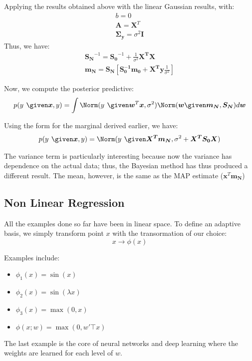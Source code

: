 \documentclass{article}
\renewcommand{\v}{\boldsymbol}
\begin{document}
Applying the results obtained above with the linear Gaussian results, with:
	\begin{align*}
		b = 0 \\
		\v{A} = \v{X}^T \\
		\v{\Sigma_y} = \sigma^2 \v{I}
	\end{align*}
	Thus, we have:
	\begin{align*}
		\v{S_N}^{-1} = \v{S_0}^{-1} + \frac{1}{\sigma^2}\v{X^T} \v{X} \\
		\v{m_N} = \v{S_N} \left [\v{S_0^{-1}} \v{m_0} + \v{X^T} \v{y} \frac{1}{\sigma^2} \right]
	\end{align*}
	
	Now, we compute the posterior predictive:
	\begin{align*}
		p(y^{~} \given \v{x}, y) = \int \Norm(y^{~}\given \v{w}^T \v{x}, \sigma^2) \Norm(\v{w} \given \v{m_N}, \v{S_N}) d\v{w}
	\end{align*}
	
	Using the form for the marginal derived earlier, we have:
	\begin{align*}
		p(y^{~} \given \v{x}, y) = \Norm (y^{~} \given \v{X^T} \v{m_N}, \sigma^2 + \v{X^T} \v{S_0} \v{X})
	\end{align*}
	
	The variance term is particularly interesting because now the variance has dependence on the actual data; thus, the Bayesian method has thus produced a different result. The mean, however, is the same as the MAP estimate ($\v{x}^T \v{m_N}$)

\subsection{Non Linear Regression}

All the examples done so far have been in linear space. To define an adaptive basis, we simply transform point $x$ with the transormation of our choice:
$$x \to \phi(x)$$

Examples include:
\begin{itemize}
\item $\phi_1(x) = \sin(x)$
\item $\phi_2(x) = \sin(\lambda x)$
\item $\phi_3(x) = \max(0, x)$
\item $\phi(x; w) = \max(0, w'\top x)$
\end{itemize}
The last example is the core of neural networks and deep learning where the weights are learned for each level of $w$.
\end{document}
